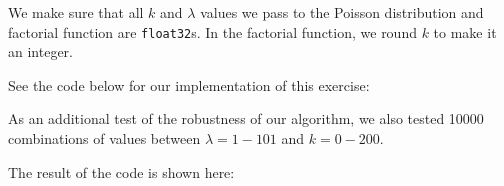 We make sure that all $k$ and $\lambda$ values we pass to the Poisson distribution and factorial function are \texttt{float32}s. In the factorial function, we round $k$ to make it an integer.

See the code below for our implementation of this exercise:


As an additional test of the robustness of our algorithm, we also tested 10000 combinations of values between $\lambda=1-101$ and $k=0-200$.

The result of the code is shown here:
